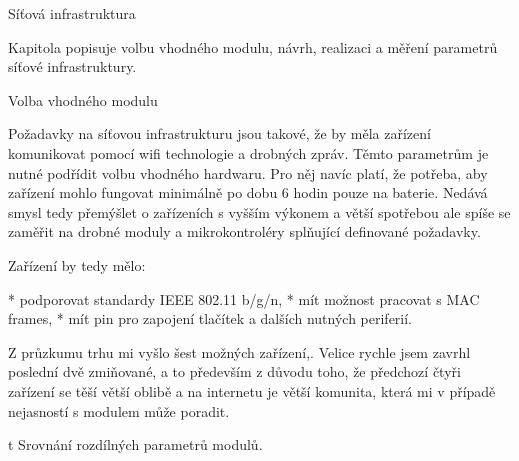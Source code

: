 
\def\ctustyle{{\ssr CTUstyle}}
\def\ttb{\tt\char`\\} %

\chap Síťová infrastruktura

Kapitola popisuje volbu vhodného modulu, návrh, realizaci a měření parametrů síťové infrastruktury.

\sec Volba vhodného modulu

Požadavky na síťovou infrastrukturu jsou takové, že by měla zařízení komunikovat pomocí wifi technologie a drobných zpráv. Těmto parametrům je nutné podřídit volbu vhodného hardwaru. Pro něj navíc platí, že potřeba, aby zařízení mohlo fungovat minimálně po dobu 6 hodin pouze na baterie. Nedává smysl tedy přemýšlet o zařízeních s vyšším výkonem a větší spotřebou ale spíše se zaměřit na drobné moduly a mikrokontroléry splňující definované požadavky.

Zařízení by tedy mělo:

\begitems
* podporovat standardy IEEE 802.11 b/g/n,
* mít možnost pracovat s MAC frames,
* mít pin pro zapojení tlačítek a dalších nutných periferií.

\enditems

Z průzkumu trhu mi vyšlo šest možných zařízení,. Velice rychle jsem zavrhl poslední dvě zmiňované, a to především z důvodu toho, že předchozí čtyři zařízení se těší větší oblibě a na internetu je větší komunita, která mi v případě nejasností s modulem může poradit.

\midinsert {}
\caption/t Srovnání rozdílných parametrů modulů.
\endinsert

